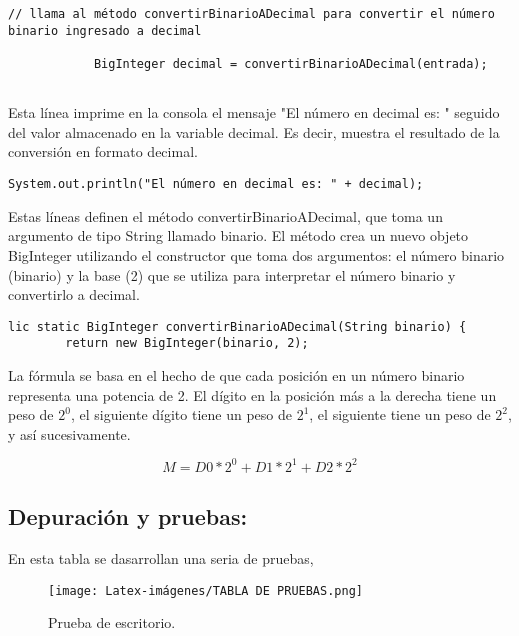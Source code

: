\begin{lstlisting}[style=javaStyle]
 // llama al método convertirBinarioADecimal para convertir el número binario ingresado a decimal
 
            BigInteger decimal = convertirBinarioADecimal(entrada);
            
\end{lstlisting}

 Esta línea imprime en la consola el mensaje "El número en decimal es: " seguido del valor almacenado en la variable decimal. Es decir, muestra el resultado de la conversión en formato decimal.

\begin{lstlisting}[style=javaStyle]
System.out.println("El número en decimal es: " + decimal);

\end{lstlisting}

Estas líneas definen el método convertirBinarioADecimal, que toma un argumento de tipo String llamado binario. El método crea un nuevo objeto BigInteger utilizando el constructor que toma dos argumentos: el número binario (binario) y la base (2) que se utiliza para interpretar el número binario y convertirlo a decimal. 

\begin{lstlisting}[style=javaStyle]
lic static BigInteger convertirBinarioADecimal(String binario) {
        return new BigInteger(binario, 2);

\end{lstlisting}

\text La fórmula se basa en el hecho de que cada posición en un número binario representa una potencia de 2. El dígito en la posición más a la derecha tiene un peso de \(2^0\), el siguiente dígito tiene un peso de \(2^1\), el siguiente tiene un peso de \(2^2\), y así sucesivamente.
\space

\begin{equation}

M = D0 * 2^0 + D1 * 2^1 + D2 * 2^2

\end{equation}


\subsection{\textbf{Depuración y pruebas:}}
En esta tabla se dasarrollan una seria de pruebas, 
\begin{figure}[H]
    \centering
    \texttt{[image: Latex-imágenes/TABLA DE PRUEBAS.png]}
    \caption{Prueba de escritorio.}
\end{figure}
